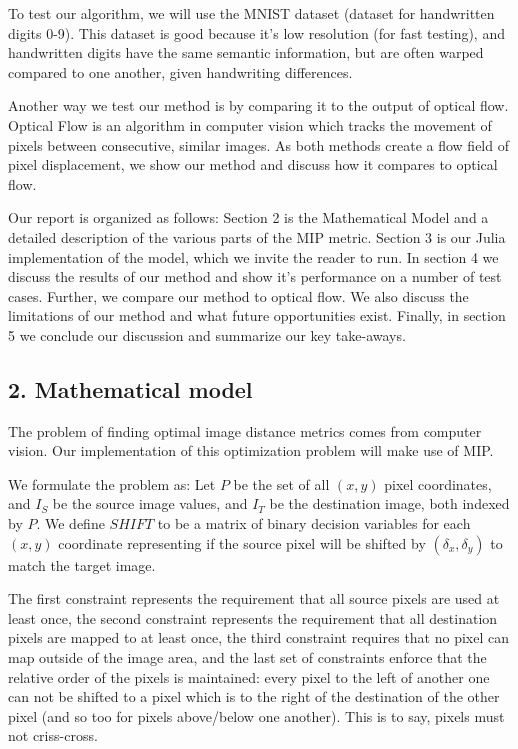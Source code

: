 \documentclass[11pt]{article}
\begin{document}
To test our algorithm, we will use the MNIST dataset (dataset for
handwritten digits 0-9). This dataset is good because it's low
resolution (for fast testing), and handwritten digits have the same
semantic information, but are often warped compared to one another,
given handwriting differences.

Another way we test our method is by comparing it to the output of
optical flow. Optical Flow is an algorithm in computer vision which
tracks the movement of pixels between consecutive, similar images. As
both methods create a flow field of pixel displacement, we show our
method and discuss how it compares to optical flow.

Our report is organized as follows: Section 2 is the Mathematical Model
and a detailed description of the various parts of the MIP metric.
Section 3 is our Julia implementation of the model, which we invite the
reader to run. In section 4 we discuss the results of our method and
show it's performance on a number of test cases. Further, we compare our
method to optical flow. We also discuss the limitations of our method
and what future opportunities exist. Finally, in section 5 we conclude
our discussion and summarize our key take-aways.

    \hypertarget{mathematical-model}{%
\subsection{2. Mathematical model}\label{mathematical-model}}

The problem of finding optimal image distance metrics comes from
computer vision. Our implementation of this optimization problem will
make use of MIP.

We formulate the problem as: Let \(P\) be the set of all \((x,y)\) pixel
coordinates, and \(I_S\) be the source image values, and \(I_T\) be the
destination image, both indexed by \(P\). We define \(SHIFT\) to be a
matrix of binary decision variables for each \((x,y)\) coordinate
representing if the source pixel will be shifted by
\((\delta_x,\delta_y)\) to match the target image.

The first constraint represents the requirement that all source pixels
are used at least once, the second constraint represents the requirement
that all destination pixels are mapped to at least once, the third
constraint requires that no pixel can map outside of the image area, and
the last set of constraints enforce that the relative order of the
pixels is maintained: every pixel to the left of another one can not be
shifted to a pixel which is to the right of the destination of the other
pixel (and so too for pixels above/below one another). This is to say,
pixels must not criss-cross.
\end{document}
